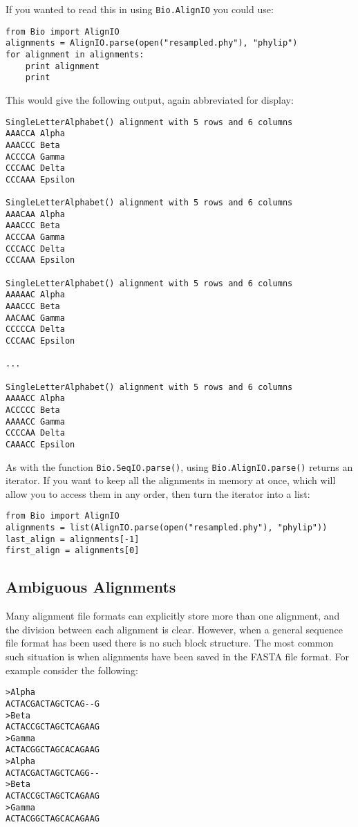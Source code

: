 \documentclass{report}
\begin{document}
If you wanted to read this in using \verb|Bio.AlignIO| you could use:

\begin{verbatim}
from Bio import AlignIO
alignments = AlignIO.parse(open("resampled.phy"), "phylip")
for alignment in alignments:
    print alignment
    print
\end{verbatim}

\noindent This would give the following output, again abbreviated for display:

\begin{verbatim}
SingleLetterAlphabet() alignment with 5 rows and 6 columns
AAACCA Alpha
AAACCC Beta
ACCCCA Gamma
CCCAAC Delta
CCCAAA Epsilon

SingleLetterAlphabet() alignment with 5 rows and 6 columns
AAACAA Alpha
AAACCC Beta
ACCCAA Gamma
CCCACC Delta
CCCAAA Epsilon

SingleLetterAlphabet() alignment with 5 rows and 6 columns
AAAAAC Alpha
AAACCC Beta
AACAAC Gamma
CCCCCA Delta
CCCAAC Epsilon

...

SingleLetterAlphabet() alignment with 5 rows and 6 columns
AAAACC Alpha
ACCCCC Beta
AAAACC Gamma
CCCCAA Delta
CAAACC Epsilon
\end{verbatim}

As with the function \verb|Bio.SeqIO.parse()|, using \verb|Bio.AlignIO.parse()| returns an iterator.
If you want to keep all the alignments in memory at once, which will allow you to access them in any order, then turn the iterator into a list:

\begin{verbatim}
from Bio import AlignIO
alignments = list(AlignIO.parse(open("resampled.phy"), "phylip"))
last_align = alignments[-1]
first_align = alignments[0]
\end{verbatim}

\subsection{Ambiguous Alignments}
\label{sec:AlignIO-count-argument}
Many alignment file formats can explicitly store more than one alignment, and the division between each alignment is clear.  However, when a general sequence file format has been used there is no such block structure.  The most common such situation is when alignments have been saved in the FASTA file format.  For example consider the following:

\begin{verbatim}
>Alpha
ACTACGACTAGCTCAG--G
>Beta
ACTACCGCTAGCTCAGAAG
>Gamma
ACTACGGCTAGCACAGAAG
>Alpha
ACTACGACTAGCTCAGG--
>Beta
ACTACCGCTAGCTCAGAAG
>Gamma
ACTACGGCTAGCACAGAAG
\end{verbatim}
\end{document}

